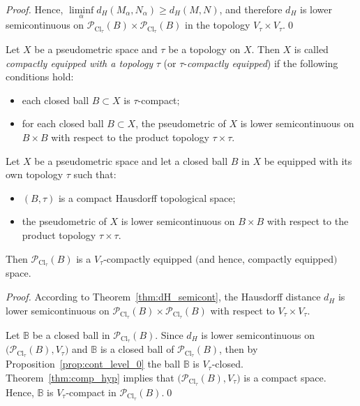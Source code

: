 \documentclass{svproc}
\def\Cl{\operatorname{Cl}}
\begin{document}
\begin{proof}
Hence, $\liminf\limits_{\alpha} d_H(M_{\alpha}, N_{\alpha})\ge d_H(M, N)$, and therefore $d_H$ is lower semicontinuous on $\mathcal{P}_{\Cl_{\tau}}(B)\times \mathcal{P}_{\Cl_{\tau}}(B)$ in the topology $V_{\tau}\times V_{\tau}$.\qed

\end{proof}

\begin{definition}
Let $X$ be a pseudometric space and $\tau$ be a topology on $X$. Then $X$ is called \textit{compactly equipped with a topology} $\tau$ (or $\tau$-\textit{compactly equipped}) if the following conditions hold$:$
\begin{itemize}
\item each closed ball $B\subset X$ is $\tau$-compact$;$
\item for each closed ball $B\subset X$, the pseudometric of $X$ is lower semicontinuous on $B\times B$ with respect to the product topology $\tau\times \tau.$
\end{itemize}
\end{definition}

\begin{theorem}\label{thm:hyperspace}
Let $X$ be a pseudometric space and let a closed ball $B$ in $X$ be equipped with its own topology $\tau$ such that$:$
\begin{itemize}
\item $(B, \tau)$ is a compact Hausdorff topological space$;$
\item the pseudometric of $X$ is lower semicontinuous on $B\times B$ with respect to the product topology $\tau\times \tau$.
\end{itemize}
Then $\mathcal{P}_{\Cl_{\tau}}(B)$ is a $V_{\tau}$-compactly equipped $($and hence, compactly equipped$)$ space.
\end{theorem}

\begin{proof}

According to Theorem~\ref{thm:dH_semicont}, the Hausdorff distance $d_H$ is lower semicontinuous on $\mathcal{P}_{\Cl_{\tau}}(B)\times \mathcal{P}_{\Cl_{\tau}}(B)$ with respect to $V_{\tau}\times V_{\tau}$.

Let $\mathbb{B}$ be a closed ball in $\mathcal{P}_{\Cl_{\tau}}(B)$. Since $d_H$ is lower semicontinuous on $\bigl(\mathcal{P}_{\Cl_{\tau}}(B), V_{\tau}\bigr)$ and $\mathbb{B}$ is a closed ball of $\mathcal{P}_{\Cl_{\tau}}(B)$, then by Proposition~\ref{prop:cont_level_0} the ball $\mathbb{B}$ is $V_{\tau}$-closed. Theorem~\ref{thm:comp_hyp} implies that $\bigl(\mathcal{P}_{\Cl_{\tau}}(B), V_{\tau}\bigr)$ is a compact space. Hence, $\mathbb{B}$ is $V_{\tau}$-compact in $\mathcal{P}_{\Cl_{\tau}}(B)$.\qed

\end{proof}
\end{document}
